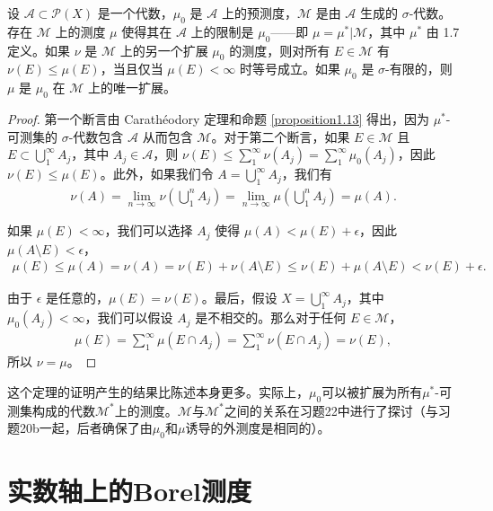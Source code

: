 \documentclass[lang=cn,10pt,thmcnt=section]{elegantbook}
\begin{document}
\begin{theorem}\label{theorem1.14}
设 $\mathcal{A} \subset \mathcal{P}(X)$ 是一个代数，$\mu_0$ 是 $\mathcal{A}$ 上的预测度，$\mathcal{M}$ 是由 $\mathcal{A}$ 生成的 $\sigma$-代数。存在 $\mathcal{M}$ 上的测度 $\mu$ 使得其在 $\mathcal{A}$ 上的限制是 $\mu_0$——即 $\mu = \mu^*|\mathcal{M}$，其中 $\mu^*$ 由 1.7 定义。如果 $\nu$ 是 $\mathcal{M}$ 上的另一个扩展 $\mu_0$ 的测度，则对所有 $E \in \mathcal{M}$ 有 $\nu(E) \leq \mu(E)$，当且仅当 $\mu(E) < \infty$ 时等号成立。如果 $\mu_0$ 是 $\sigma$-有限的，则 $\mu$ 是 $\mu_0$ 在 $\mathcal{M}$ 上的唯一扩展。
\end{theorem}

\begin{proof}
第一个断言由 Carathéodory 定理和命题 \ref{proposition1.13} 得出，因为 $\mu^*$-可测集的 $\sigma$-代数包含 $\mathcal{A}$ 从而包含 $\mathcal{M}$。对于第二个断言，如果 $E \in \mathcal{M}$ 且 $E \subset \bigcup_{1}^{\infty} A_j$，其中 $A_j \in \mathcal{A}$，则 $\nu(E) \leq \sum_{1}^{\infty} \nu(A_j) = \sum_{1}^{\infty} \mu_0(A_j)$，因此 $\nu(E) \leq \mu(E)$。此外，如果我们令 $A = \bigcup_{1}^{\infty} A_j$，我们有
\begin{align}
\nu(A) = \lim_{n \to \infty} \nu\left(\bigcup_{1}^{n} A_j\right) = \lim_{n \to \infty} \mu\left(\bigcup_{1}^{n} A_j\right) = \mu(A).
\end{align}

如果 $\mu(E) < \infty$，我们可以选择 $A_j$ 使得 $\mu(A) < \mu(E) + \epsilon$，因此 $\mu(A \setminus E) < \epsilon$，
\begin{align}
\mu(E) \leq \mu(A) = \nu(A) = \nu(E) + \nu(A \setminus E) \leq \nu(E) + \mu(A \setminus E) < \nu(E) + \epsilon.
\end{align}

由于 $\epsilon$ 是任意的，$\mu(E) = \nu(E)$。最后，假设 $X = \bigcup_{1}^{\infty} A_j$，其中 $\mu_0(A_j) < \infty$，我们可以假设 $A_j$ 是不相交的。那么对于任何 $E \in \mathcal{M}$，
\begin{align}
\mu(E) = \sum_{1}^{\infty} \mu(E \cap A_j) = \sum_{1}^{\infty} \nu(E \cap A_j) = \nu(E),
\end{align}
所以 $\nu = \mu$。
\end{proof}

这个定理的证明产生的结果比陈述本身更多。实际上，$\mu_0$可以被扩展为所有$\mu^*$-可测集构成的代数$\mathcal{M}^*$上的测度。$\mathcal{M}$与$\mathcal{M}^*$之间的关系在习题22中进行了探讨（与习题20b一起，后者确保了由$\mu_0$和$\mu$诱导的外测度是相同的）。

\section{实数轴上的Borel测度}
\end{document}
